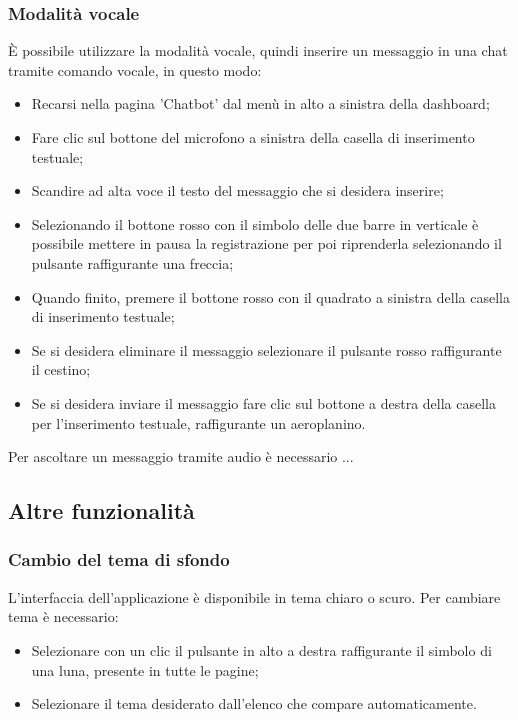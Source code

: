 \documentclass[10pt, a4paper]{article}
\begin{document}
\subsubsection{Modalità vocale}
È possibile utilizzare la modalità vocale, quindi inserire un messaggio in una chat tramite comando vocale, in questo modo:
\begin{itemize}
    \item Recarsi nella pagina 'Chatbot' dal menù in alto a sinistra della dashboard;
    \item Fare clic sul bottone del microfono a sinistra della casella di inserimento testuale;
    \item Scandire ad alta voce il testo del messaggio che si desidera inserire;
    \item Selezionando il bottone rosso con il simbolo delle due barre in verticale è possibile mettere in pausa la registrazione per poi riprenderla selezionando il pulsante raffigurante una freccia;
    \item Quando finito, premere il bottone rosso con il quadrato a sinistra della casella di inserimento testuale;
    \item Se si desidera eliminare il messaggio selezionare il pulsante rosso raffigurante il cestino;
    \item Se si desidera inviare il messaggio fare clic sul bottone a destra della casella per l'inserimento testuale, raffigurante un aeroplanino.
\end{itemize}
Per ascoltare un messaggio tramite audio è necessario ...

\subsection{Altre funzionalità}
\subsubsection{Cambio del tema di sfondo}
L'interfaccia dell'applicazione è disponibile in tema chiaro o scuro. Per cambiare tema è necessario:
\begin{itemize}
    \item Selezionare con un clic il pulsante in alto a destra raffigurante il simbolo di una luna, presente in tutte le pagine;
    \item Selezionare il tema desiderato dall'elenco che compare automaticamente.
\end{itemize}
\end{document}
